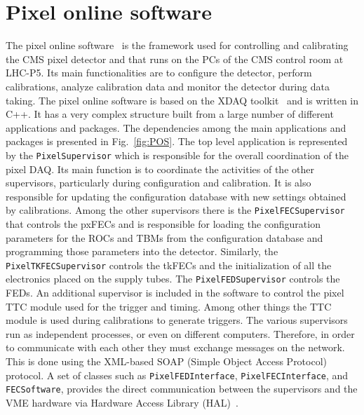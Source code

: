 \section{Pixel online software}\label{sec:BPix_POS}

The pixel online software~\cite{POSCalib} is the framework used for controlling and calibrating the CMS pixel detector and that runs on the PCs of the CMS control room at LHC-P5.
Its main functionalities are to configure the detector, perform calibrations, analyze calibration data and monitor the detector during data taking.
The pixel online software is based on the XDAQ toolkit~\cite{Brigljevic:2003kg} and is written in C++. It has a very complex structure built from a large number of different applications and packages.
The dependencies among the main applications and packages is presented in Fig.~\ref{fig:POS}.
The top level application is represented by the \texttt{PixelSupervisor} which is responsible for the overall coordination of the pixel DAQ.
Its main function is to coordinate the activities of the other supervisors, particularly during configuration and calibration.
It is also responsible for updating the configuration database with new settings obtained by calibrations.
Among the other supervisors there is the \texttt{PixelFECSupervisor} that controls the pxFECs and is responsible for loading the configuration parameters for the ROCs and TBMs from the configuration database and programming those parameters into the detector.
Similarly, the \texttt{PixelTKFECSupervisor} controls the tkFECs and the initialization of all the electronics placed on the supply tubes. The \texttt{PixelFEDSupervisor} controls the FEDs.
An additional supervisor is included in the software to control the pixel TTC module used for the trigger and timing. Among other things the TTC module is used during calibrations to generate triggers.
The various supervisors run as independent processes, or even on different computers. Therefore, in order to communicate with each other they must exchange messages on the network. This is done using the XML-based SOAP (Simple Object Access Protocol) protocol.
A set of classes such as \texttt{PixelFEDInterface}, \texttt{PixelFECInterface}, and \texttt{FECSoftware}, provides the direct communication between the supervisors and the VME hardware via Hardware Access Library (HAL)~\cite{HAL}.


